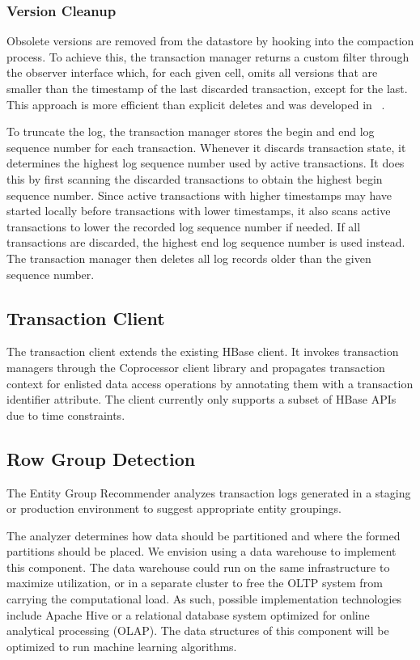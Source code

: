 \documentclass[10pt,final,journal]{IEEEtran}
\begin{document}
 \subsubsection{Version Cleanup}
Obsolete versions are removed from the datastore by hooking into the compaction process. To achieve this, the transaction manager returns a custom filter through the observer interface which, for each given cell, omits all versions that are smaller than the timestamp of the last discarded transaction, except for the last. This approach is more efficient than explicit deletes and was developed in ~\cite{Junqueira:2011:LTS:2056318.2057148}.

To truncate the log, the transaction manager stores the begin and end log sequence number for each transaction. Whenever it discards transaction state, it determines the highest log sequence number used by active transactions. It does this by first scanning the discarded transactions to obtain the highest begin sequence number. Since active transactions with higher timestamps may have started locally before transactions with lower timestamps, it also scans active transactions to lower the recorded log sequence number if needed. If all transactions are discarded, the highest end log sequence number is used instead. The transaction manager then deletes all log records older than the given sequence number.

\subsection{Transaction Client}
The transaction client extends the existing HBase client. It invokes transaction managers through the Coprocessor client library and propagates transaction context for enlisted data access operations by annotating them with a transaction identifier attribute. The client currently only supports a subset of HBase APIs due to time constraints.

\subsection{Row Group Detection}
The Entity Group Recommender analyzes transaction logs generated in a staging or production environment to suggest appropriate entity groupings.

The analyzer determines how data should be partitioned and where the formed partitions should be placed. We envision using a data warehouse to implement this component. The data warehouse could run on the same infrastructure to maximize utilization, or in a separate cluster to free the OLTP system from carrying the computational load. As such, possible implementation technologies include Apache Hive or a relational database system optimized for online analytical processing (OLAP). The data structures of this component will be optimized to run machine learning algorithms.
\end{document}
